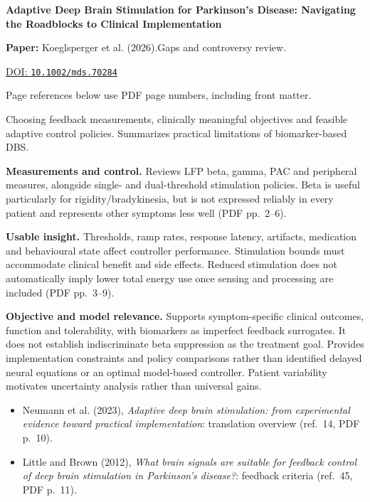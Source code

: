 

{\Large\bfseries Adaptive Deep Brain Stimulation for Parkinson's Disease: Navigating the Roadblocks to Clinical Implementation\par}

\textbf{Paper:} Koeglsperger et al. (2026).\quad Gaps and controversy review.\par
\href{https://doi.org/10.1002/mds.70284}{DOI: \nolinkurl{10.1002/mds.70284}}\par
{\footnotesize Page references below use PDF page numbers, including front matter.}

Choosing feedback measurements, clinically meaningful objectives and feasible adaptive control policies. Summarizes practical limitations of biomarker-based DBS.

\textbf{Measurements and control.} Reviews LFP beta, gamma, PAC and peripheral measures, alongside single- and dual-threshold stimulation policies. Beta is useful particularly for rigidity/bradykinesia, but is not expressed reliably in every patient and represents other symptoms less well (PDF pp.~2--6).

\textbf{Usable insight.} Thresholds, ramp rates, response latency, artifacts, medication and behavioural state affect controller performance. Stimulation bounds must accommodate clinical benefit and side effects. Reduced stimulation does not automatically imply lower total energy use once sensing and processing are included (PDF pp.~3--9).

\textbf{Objective and model relevance.} Supports symptom-specific clinical outcomes, function and tolerability, with biomarkers as imperfect feedback surrogates. It does not establish indiscriminate beta suppression as the treatment goal. Provides implementation constraints and policy comparisons rather than identified delayed neural equations or an optimal model-based controller. Patient variability motivates uncertainty analysis rather than universal gains.

\begin{itemize}
\item Neumann et al. (2023), \emph{Adaptive deep brain stimulation: from experimental evidence toward practical implementation}: translation overview (ref.~14, PDF p.~10).
\item Little and Brown (2012), \emph{What brain signals are suitable for feedback control of deep brain stimulation in Parkinson's disease?}: feedback criteria (ref.~45, PDF p.~11).
\end{itemize}


